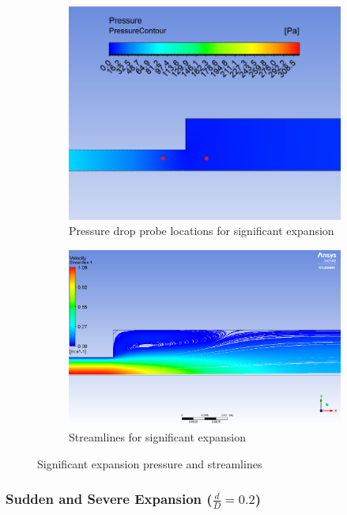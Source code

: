 \begin{figure}[H]
\centering
\hfill
\begin{subfigure}{.48\textwidth}
    \includegraphics[width=.95\linewidth]{images/task3/04_locations.png}
    \caption{Pressure drop probe locations for significant expansion}
    \label{fig:04_locs}
\end{subfigure}
\hfill
\begin{subfigure}{.48\textwidth}
    \includegraphics[width=.95\linewidth]{images/task3/04_streamlines.png}
    \caption{Streamlines for significant expansion}
    \label{fig:04_stream}
\end{subfigure}
\label{fig:04_figure}
\caption{Significant expansion pressure and streamlines}
\end{figure}


\subsubsection{Sudden and Severe Expansion ($\frac{d}{D} = 0.2$)}

